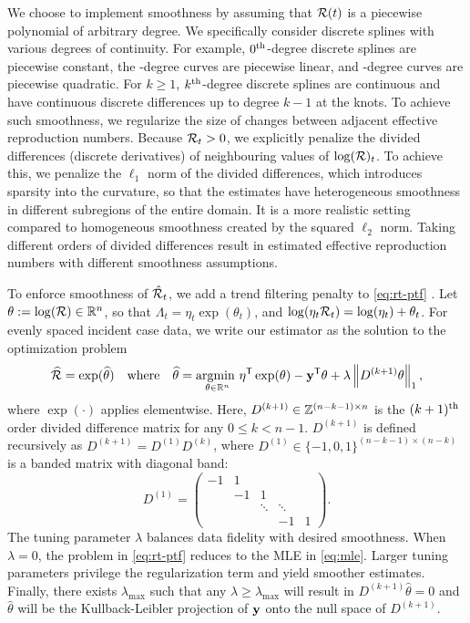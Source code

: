 We choose to implement smoothness by assuming that $\mathcal{R}(t)$ is a piecewise
polynomial of arbitrary degree. We specifically consider discrete splines with
various degrees of continuity. For example, $0^{\textnormal{th}}$-degree discrete splines are
piecewise constant, the \first-degree curves are piecewise linear, and
\second-degree curves are piecewise quadratic. For $k\geq 1$, $k^{\textnormal{th}}$-degree
discrete splines are continuous and have continuous discrete differences up to
degree $k-1$ at the knots. To achieve such smoothness, we regularize the size of
changes between adjacent effective reproduction numbers. Because $\mathcal{R}_t > 0$,
we explicitly penalize the divided differences (discrete derivatives) of
neighbouring values of $\log(\mathcal{R})_t$. To achieve this, we penalize the
$\ell_1$ norm of the divided differences, which introduces sparsity into the
curvature, so that the estimates have heterogeneous smoothness in different
subregions of the entire domain. It is a more realistic setting compared to
homogeneous smoothness created by the squared $\ell_2$ norm. Taking different
orders of divided differences result in estimated effective reproduction numbers
with different smoothness assumptions. 

To enforce smoothness of $\hat{\mathcal{R}}_t$, we add a trend filtering penalty to
\eqref{eq:rt-ptf}
\citep{kim2009ell_1,tibshirani2014adaptive,tibshirani2022divided,sadhanala2022exponential}.
Let $\theta := \log(\mathcal{R}) \in \mathbb{R}^n$, so that $\Lambda_t =
\eta_t \exp(\theta_t)$, and $\log(\eta_t \mathcal{R}_t) = \log(\eta_t) +
\theta_t$. For evenly spaced incident case data, we
write our estimator as the solution to the optimization problem
\begin{equation} 
  \label{eq:rt-ptf}
  \widehat{\mathcal{R}} = \exp(\widehat{\theta}) \quad\textrm{where}\quad \widehat{\theta} = \underset{\theta\in\mathbb{R}^n}{\operatorname*{argmin}\ } \eta^{\mathsf{T}} \exp(\theta) - \mathbf{y}^{\mathsf{T}} \theta + \lambda \left\lVert D^{(k+1)} \theta \right\rVert_1,
\end{equation}
where $\exp(\cdot)$ applies elementwise.
Here, $D^{(k+1)} \in \mathbb{Z}^{(n-k-1)\times n}$ is the $(k+1)^{\textnormal{th}}$ order divided
difference matrix for any $0\leq k < n-1$. $D^{(k+1)}$ is defined recursively as
$D^{(k+1)} = D^{(1)} D^{(k)}$, where $D^{(1)} \in \{-1,0,1\}^{(n-k-1)\times
(n-k)}$ is a banded matrix with diagonal band: 
$$D^{(1)} = \begin{pmatrix} 
  -1 & 1 &  & & \\ 
  & -1 & 1 & & \\ 
  & & \ddots & \ddots & \\
  & & & -1 & 1 
\end{pmatrix}.$$ 
The tuning parameter $\lambda$ balances data
fidelity with desired smoothness. When $\lambda=0$, the problem in
\eqref{eq:rt-ptf} reduces to the MLE in \eqref{eq:mle}. Larger tuning parameters
privilege the regularization term and yield smoother estimates. Finally, there
exists $\lambda_{\textrm{max}}$ such that any $\lambda \geq
\lambda_{\textrm{max}}$ will result in $D^{(k+1)} \widehat {\theta} = 0$ and
$\widehat{\theta}$ will be the Kullback-Leibler projection of $\mathbf{y}$ onto the
null space of $D^{(k+1)}$.


